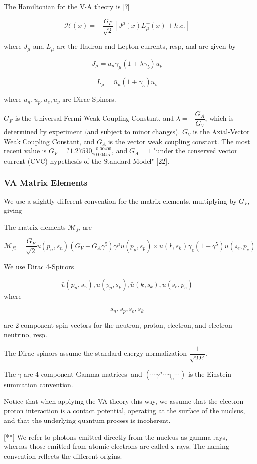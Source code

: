 \documentclass[11pt]{amsart}
\begin{document}
The Hamiltonian for the V-A theory is [?]

$$\mathcal{H}(x)=-\dfrac{G_{F}}{\sqrt{2}}\left[J^{\mu}(x)L^{+}_{\mu}(x)+h.c.\right]$$

where $J_{\mu}$ and $L_{\mu}$ are the Hadron and Lepton currents, resp, and are given by

$$J_{\mu}=\bar{u}_{n}\gamma_{\mu}(1+\lambda\gamma_{5})u_{p}$$

$$L_{\mu}=\bar{u}_{\mu}(1+\gamma_{5})u_{e}$$

where $u_{n},u_{p},u_{e},u_{\nu}$ are Dirac Spinors.

$G_{F}$ is the Universal Fermi Weak Coupling Constant, and $\lambda=-\dfrac{G_{A}}{G_{V}}$, which is determined by experiment (and subject to minor changes).  $G_{V}$ is the Axial-Vector Weak Coupling Constant, and $G_{A}$ is the vector weak coupling
constant.  The most recent value is $G_{V}=?1.27590^{+0.00409}_{?0.00445}$, and $G_{A}=1$ "under the conserved vector current (CVC) hypothesis of the Standard Model" [22].

\subsubsection{VA Matrix Elements}

We use a slightly different convention for the matrix elements, multiplying by $G_{V}$, giving

The matrix elements $\mathcal{M}_{fi}$ are

$$\mathcal{M}_{fi}=\dfrac{G_{F}}{\sqrt{2}}\bar{u}(p_{n},s_{n})(G_{V}-G_{A}\gamma^{5})\gamma^{\mu}u(p_{p},s_{p})\times\bar{u}(k,s_{k})\gamma_{u}(1-\gamma^{5})u(s_{e},p_{e})$$


We use Dirac 4-Spinors

$$\bar{u}(p_{n},s_{n}),u(p_{p},s_{p}),\bar{u}(k,s_{k}),u(s_{e},p_{e})$$
where

$$s_{n}, s_{p},s_{e},s_{k}$$ 

are 2-component spin vectors for the neutron, proton, electron, and electron neutrino, resp. 

The Dirac spinors assume the standard energy normalization $\dfrac{1}{\sqrt{2E}}$.

The $\gamma$ are 4-component Gamma matrices, and  $(\cdots\gamma^{\mu}\cdots\gamma_{u}\cdots)$ is the Einstein summation convention.


Notice that when applying the VA theory this way, we assume that the electron-proton interaction is a contact potential, operating at the surface of the nucleus, and that the underlying quantum process is incoherent.  



[**] We refer to photons emitted directly from the nucleus as gamma rays, whereas those emitted from atomic electrons are called x-rays.    The naming convention reflects the different origins.
\end{document}
